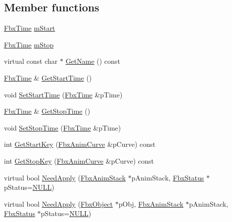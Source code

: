 \subsection*{Member functions}
\begin{DoxyCompactItemize}
\item 
\hyperlink{class_fbx_time}{Fbx\+Time} \hyperlink{class_fbx_anim_curve_filter_afb8079a673486763ec97bea38641bc54}{m\+Start}
\item 
\hyperlink{class_fbx_time}{Fbx\+Time} \hyperlink{class_fbx_anim_curve_filter_ad3be4640799f960d1910a2e3132e82eb}{m\+Stop}
\item 
virtual const char $\ast$ \hyperlink{class_fbx_anim_curve_filter_abd559d5052fbb072042e59241940a35c}{Get\+Name} () const
\item 
\hyperlink{class_fbx_time}{Fbx\+Time} \& \hyperlink{class_fbx_anim_curve_filter_a0695d801a1a8d5e6ca9f4e992d9af7ff}{Get\+Start\+Time} ()
\item 
void \hyperlink{class_fbx_anim_curve_filter_ad5833e1664b9621b4bafef76944ad383}{Set\+Start\+Time} (\hyperlink{class_fbx_time}{Fbx\+Time} \&p\+Time)
\item 
\hyperlink{class_fbx_time}{Fbx\+Time} \& \hyperlink{class_fbx_anim_curve_filter_afef1281c6f615676466c65ff8c7186a9}{Get\+Stop\+Time} ()
\item 
void \hyperlink{class_fbx_anim_curve_filter_a75fd5bf41a315dd12d8efb3184a17fc8}{Set\+Stop\+Time} (\hyperlink{class_fbx_time}{Fbx\+Time} \&p\+Time)
\item 
int \hyperlink{class_fbx_anim_curve_filter_af428acfb5850fe1d91d7d99bfc5ccab2}{Get\+Start\+Key} (\hyperlink{class_fbx_anim_curve}{Fbx\+Anim\+Curve} \&p\+Curve) const
\item 
int \hyperlink{class_fbx_anim_curve_filter_a94f41fc2b018813560c250c598602cb2}{Get\+Stop\+Key} (\hyperlink{class_fbx_anim_curve}{Fbx\+Anim\+Curve} \&p\+Curve) const
\item 
virtual bool \hyperlink{class_fbx_anim_curve_filter_af95af2469851b88b4f6d38401ace5791}{Need\+Apply} (\hyperlink{class_fbx_anim_stack}{Fbx\+Anim\+Stack} $\ast$p\+Anim\+Stack, \hyperlink{class_fbx_status}{Fbx\+Status} $\ast$p\+Status=\hyperlink{fbxarch_8h_a070d2ce7b6bb7e5c05602aa8c308d0c4}{N\+U\+LL})
\item 
virtual bool \hyperlink{class_fbx_anim_curve_filter_a09438dd8d0e9bcb934e6a4b6fc51bcd7}{Need\+Apply} (\hyperlink{class_fbx_object}{Fbx\+Object} $\ast$p\+Obj, \hyperlink{class_fbx_anim_stack}{Fbx\+Anim\+Stack} $\ast$p\+Anim\+Stack, \hyperlink{class_fbx_status}{Fbx\+Status} $\ast$p\+Status=\hyperlink{fbxarch_8h_a070d2ce7b6bb7e5c05602aa8c308d0c4}{N\+U\+LL})

\end{DoxyCompactItemize}

